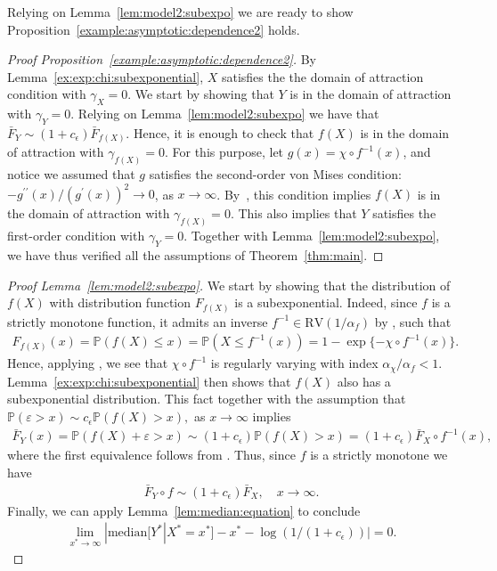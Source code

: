 \documentclass{statsoc}
\theoremstyle{break}
\renewcommand{\P}{\mathbb P}
\def\M{\text{median}}
\newcommand{\beao}{\begin{eqnarray*}}
\newcommand{\eeao}{\end{eqnarray*}\noindent}
\newcommand{\beam}{\begin{eqnarray}}
\newcommand{\eeam}{\end{eqnarray}\noindent}
\begin{document}
Relying on Lemma~\ref{lem:model2:subexpo} we are ready to show Proposition~\ref{example:asymptotic:dependence2} holds.
\begin{proof}[Proof Proposition~\ref{example:asymptotic:dependence2}]

By Lemma~\ref{ex:exp:chi:subexponential}, $X$ satisfies the the domain of attraction condition with $\gamma_X = 0$.
We start by showing that $Y$ is in the domain of attraction with $\gamma_Y = 0$. 
Relying on Lemma~\ref{lem:model2:subexpo} we have that $\bar F_Y \sim (1+c_\epsilon) \bar F_{f(X)}$. 
Hence, it is enough to check that $f(X)$ is in the domain of attraction with $\gamma_{f(X)} = 0$.
For this purpose, let $g(x) = \chi \circ f^{-1}(x)$, and notice we assumed that $g$ satisfies the second-order von Mises condition: $-{g^{\prime \prime} (x) }/{({g^\prime}(x))^2} \to 0$, as $x \to \infty$.
By~\citet[][Example 3.3.24]{embrechts:kluppelberg:mikosch:2013}, this condition implies $f(X)$ is in the domain of attraction with $\gamma_{f(X)} = 0$. 
This also implies that $Y$ satisfies the first-order condition with $\gamma_Y = 0$.
Together with Lemma~\ref{lem:model2:subexpo}, we have thus verified all the assumptions of Theorem~\ref{thm:main}.
\end{proof}


\begin{proof}[Proof Lemma~\ref{lem:model2:subexpo}]
	We start by showing that the distribution of $f(X)$ with distribution function $F_{f(X)}$ is a subexponential. Indeed, since $f$ is a strictly 
	monotone function, it admits an inverse $ f^{-1} \in \text{RV}(1/\alpha_f)$ by \cite[Proposition 2.6(v)]{resnick:2007}, such that
	\beam\label{eq:bound:margins:subexponential} 
	F_{f(X)}(x) = \P( f(X) \leq x ) = \P( X \leq f^{-1}(x)) = 1-\exp\{ - \chi \circ f^{-1} (x) \}.
	\eeam 
	Hence, applying \cite[Proposition 2.6(v)]{resnick:2007}, we see that $\chi \circ f^{-1}$ is regularly varying with index $\alpha_\chi/\alpha_f < 1$. 
	Lemma~\ref{ex:exp:chi:subexponential} then shows that $f(X)$ also has a subexponential distribution. 
	This fact together with the assumption that $\P(\varepsilon > x) \sim c_\epsilon \P(f(X) > x),$ as $x \to \infty$   implies \begin{align*}
		\bar F_Y(x) = \P(f(X) + \varepsilon > x) \sim (1+c_\epsilon) \P(f(X) > x) = (1+c_\epsilon) \bar F_X\circ  f^{-1}(x),
	\end{align*}
	where the first equivalence follows from \cite[Theorem 1]{cline:1986}. 
	Thus, since $f$ is a strictly monotone we have 
	\beao   \bar F_Y \circ f \sim (1+c_\epsilon) \bar F_X, \quad  x\to\infty. 
	\eeao 
	Finally, we can apply Lemma~\ref{lem:median:equation} to conclude
	\beao 
	\lim_{x^* \to \infty }|\M[Y^* | X^* = x^*] - x^* - \log(1/(1+c_\epsilon))|  = 0. 
	\eeao 
	
\end{proof}
\end{document}
